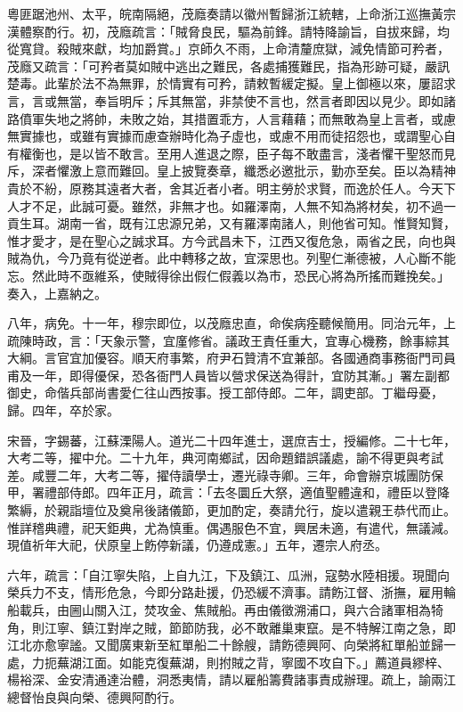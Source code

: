 \begin{pinyinscope}
粵匪踞池州、太平，皖南隔絕，茂廕奏請以徽州暫歸浙江統轄，上命浙江巡撫黃宗漢體察酌行。初，茂廕疏言：「賊脅良民，驅為前鋒。請特降諭旨，自拔來歸，均從寬貸。殺賊來獻，均加爵賞。」京師久不雨，上命清釐庶獄，減免情節可矜者，茂廕又疏言：「可矜者莫如賊中逃出之難民，各處捕獲難民，指為形跡可疑，嚴訊楚毒。此輩於法不為無罪，於情實有可矜，請敕暫緩定擬。皇上御極以來，屢詔求言，言或無當，奉旨明斥；斥其無當，非禁使不言也，然言者即因以見少。即如諸路僨軍失地之將帥，未敗之始，其措置乖方，人言藉藉；而無敢為皇上言者，或慮無實據也，或雖有實據而慮查辦時化為子虛也，或慮不用而徒招怨也，或謂聖心自有權衡也，是以皆不敢言。至用人進退之際，臣子每不敢盡言，淺者懼干聖怒而見斥，深者懼激上意而難回。皇上披覽奏章，纖悉必邀批示，勤亦至矣。臣以為精神貴於不紛，原務其遠者大者，舍其近者小者。明主勞於求賢，而逸於任人。今天下人才不足，此誠可憂。雖然，非無才也。如羅澤南，人無不知為將材矣，初不過一貢生耳。湖南一省，既有江忠源兄弟，又有羅澤南諸人，則他省可知。惟賢知賢，惟才愛才，是在聖心之誠求耳。方今武昌未下，江西又復危急，兩省之民，向也與賊為仇，今乃竟有從逆者。此中轉移之故，宜深思也。列聖仁漸德被，人心斷不能忘。然此時不亟維系，使賊得徐出假仁假義以為市，恐民心將為所搖而難挽矣。」奏入，上嘉納之。

八年，病免。十一年，穆宗即位，以茂廕忠直，命俟病痊聽候簡用。同治元年，上疏陳時政，言：「天象示警，宜廑修省。議政王責任重大，宜專心機務，餘事綜其大綱。言官宜加優容。順天府事繁，府尹石贊清不宜兼部。各國通商事務衙門司員甫及一年，即得優保，恐各衙門人員皆以營求保送為得計，宜防其漸。」署左副都御史，命偕兵部尚書愛仁往山西按事。授工部侍郎。二年，調吏部。丁繼母憂，歸。四年，卒於家。

宋晉，字錫蕃，江蘇溧陽人。道光二十四年進士，選庶吉士，授編修。二十七年，大考二等，擢中允。二十九年，典河南鄉試，因命題錯誤議處，諭不得更與考試差。咸豐二年，大考二等，擢侍讀學士，遷光祿寺卿。三年，命會辦京城團防保甲，署禮部侍郎。四年正月，疏言：「去冬圜丘大祭，適值聖體違和，禮臣以登降繁縟，於親詣壇位及奠帛後諸儀節，更加酌定，奏請允行，旋以遣親王恭代而止。惟詳稽典禮，祀天鉅典，尤為慎重。偶遇服色不宜，興居未適，有遣代，無議減。現值祈年大祀，伏原皇上飭停新議，仍遵成憲。」五年，遷宗人府丞。

六年，疏言：「自江寧失陷，上自九江，下及鎮江、瓜洲，寇勢水陸相援。現聞向榮兵力不支，情形危急，今即分路赴援，仍恐緩不濟事。請飭江督、浙撫，雇用輪船載兵，由圌山關入江，焚攻金、焦賊船。再由儀徵溯浦口，與六合諸軍相為犄角，則江寧、鎮江對岸之賊，節節防我，必不敢離巢東竄。是不特解江南之急，即江北亦愈寧謐。又聞廣東新至紅單船二十餘艘，請飭德興阿、向榮將紅單船並歸一處，力扼蕪湖江面。如能克復蕪湖，則拊賊之背，寧國不攻自下。」薦道員繆梓、楊裕深、金安清通達治體，洞悉夷情，請以雇船籌費諸事責成辦理。疏上，諭兩江總督怡良與向榮、德興阿酌行。


\end{pinyinscope}
